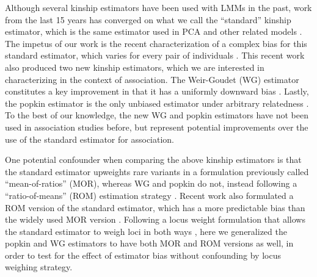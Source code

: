 \documentclass[11pt]{article}
\begin{document}
Although several kinship estimators have been used with LMMs in the past, work from the last 15 years has converged on what we call the ``standard'' kinship estimator, which is the same estimator used in PCA and other related models \citep{price_principal_2006, astle_population_2009, rakovski_kinship-based_2009, thornton_roadtrips:_2010, yang_common_2010, yang_gcta:_2011, zhou_genome-wide_2012, speed_improved_2012, yang_advantages_2014, speed_relatedness_2015, loh_efficient_2015, wang_efficient_2017, sul_population_2018}.
The impetus of our work is the recent characterization of a complex bias for this standard estimator, which varies for every pair of individuals \citep{weir_unified_2017, ochoa_estimating_2021}.
This recent work also produced two new kinship estimators, which we are interested in characterizing in the context of association.
The Weir-Goudet (WG) estimator constitutes a key improvement in that it has a uniformly downward bias \citep{weir_unified_2017, ochoa_estimating_2021}.
Lastly, the popkin estimator is the only unbiased estimator under arbitrary relatedness \citep{ochoa_estimating_2021}.
To the best of our knowledge, the new WG and popkin estimators have not been used in association studies before, but represent potential improvements over the use of the standard estimator for association.

One potential confounder when comparing the above kinship estimators is that the standard estimator upweights rare variants in a formulation previously called ``mean-of-ratios'' (MOR), whereas WG and popkin do not, instead following a ``ratio-of-means'' (ROM) estimation strategy \citep{bhatia_estimating_2013, ochoa_estimating_2021}.
Recent work also formulated a ROM version of the standard estimator, which has a more predictable bias than the widely used MOR version \citep{ochoa_estimating_2021}.
Following a locus weight formulation that allows the standard estimator to weigh loci in both ways \citep{wang_efficient_2017}, here we generalized the popkin and WG estimators to have both MOR and ROM versions as well, in order to test for the effect of estimator bias without confounding by locus weighing strategy.
\end{document}
